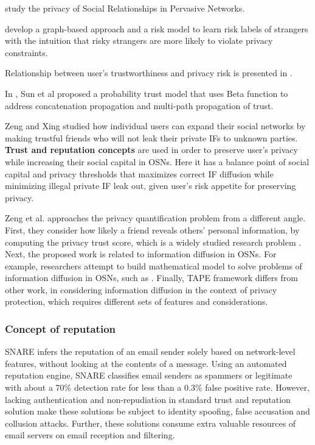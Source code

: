 \cite{bilogrevic_multi-dimensional_2014} study the privacy of Social Relationships in Pervasive Networks.

\cite{akcora_risks_2012} develop a graph-based approach and a risk model to learn risk labels of strangers with the intuition that risky strangers are more likely to violate privacy constraints.

Relationship between user’s trustworthiness and privacy risk is presented in \cite{pandey_computing_2015}.


In \cite{gundecha_exploiting_2011},
	Sun et al proposed a probability trust model that uses Beta function to address concatenation propagation and multi-path propagation of trust.

Zeng and Xing \cite{yongbo_zeng_study_2015} studied how individual users can expand their social networks by making trustful friends who will not leak their private IFs to unknown parties.
\textbf{Trust and reputation concepts} are used in order to preserve user’s privacy while increasing their social capital in OSNs.
Here it has a balance point of social capital and privacy thresholds that maximizes correct IF diffusion while minimizing illegal private IF leak out,
	given user’s risk appetite for preserving privacy.

Zeng et al. \cite{yongbo_zeng_study_2015} approaches the privacy quantification problem from a different angle.
First,
	they consider how likely a friend reveals others’ personal information,
	by computing the privacy trust score,
	which is a widely studied research problem \cite{gundecha_exploiting_2011}.
Next,
	the proposed work is related to information diffusion in OSNs.
For example,
	researchers attempt to build mathematical model to solve problems of information diffusion in OSNs,
	such as \cite{fang_privacy_2010}.
Finally,
TAPE framework differs from other work,
	in considering information diffusion in the context of privacy protection,
	which requires different sets of features and considerations.


\subsubsection{Concept of reputation}

SNARE \cite{hao_detecting_2009} infers the reputation of an email sender solely based on network-level features,
	without looking at the contents of a message.
Using an automated reputation engine,
	SNARE classifies email senders as spammers or legitimate with about a 70\% detection rate for less than a 0.3\% false positive rate.
However,
	lacking authentication and non-repudiation in standard trust and reputation solution make these solutions be subject to identity spoofing,
	false accusation and collusion attacks.
Further,
	these solutions consume extra valuable resources of email servers on email reception and filtering.

